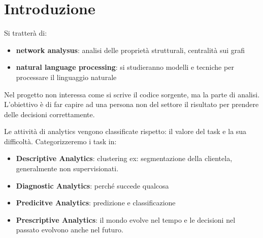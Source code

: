 \chapter{Introduzione}
Si tratterà di:
\begin{itemize}
    \item \textbf{network analysus}: analisi delle proprietà strutturali, centralità sui 
    grafi
    \item \textbf{natural language processing}: si studieranno modelli e tecniche per 
    processare il linguaggio naturale
\end{itemize}
Nel progetto non interessa come si scrive il codice sorgente, ma la parte di analisi.
L'obiettivo è di far capire ad una persona non del settore il risultato per prendere
delle decisioni correttamente.

Le attività di analytics vengono classificate rispetto: il valore del task e la 
sua difficoltà.
Categorizzeremo i task in:
\begin{itemize}
    \item \textbf{Descriptive Analytics}: clustering ex: segmentazione della clientela, generalmente 
    non supervisionati. 
    \item \textbf{Diagnostic Analytics}: perché succede qualcosa
    \item \textbf{Predicitve Analytics}: predizione e classificazione
    \item \textbf{Prescriptive Analytics}: il mondo evolve nel tempo e le decisioni nel 
    passato evolvono anche nel futuro.
\end{itemize} 


